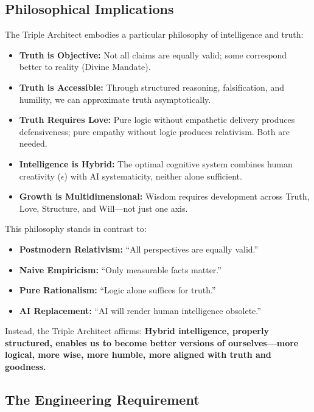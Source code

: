 \documentclass[11pt,a4paper]{article}
\theoremstyle{definition}
\theoremstyle{remark}
\begin{document}
\subsection{Philosophical Implications}

The Triple Architect embodies a particular philosophy of intelligence and truth:

\begin{itemize}
    \item \textbf{Truth is Objective:} Not all claims are equally valid; some correspond better to reality (Divine Mandate).
    
    \item \textbf{Truth is Accessible:} Through structured reasoning, falsification, and humility, we can approximate truth asymptotically.
    
    \item \textbf{Truth Requires Love:} Pure logic without empathetic delivery produces defensiveness; pure empathy without logic produces relativism. Both are needed.
    
    \item \textbf{Intelligence is Hybrid:} The optimal cognitive system combines human creativity ($\epsilon$) with AI systematicity, neither alone sufficient.
    
    \item \textbf{Growth is Multidimensional:} Wisdom requires development across Truth, Love, Structure, and Will—not just one axis.
\end{itemize}

This philosophy stands in contrast to:
\begin{itemize}
    \item \textbf{Postmodern Relativism:} ``All perspectives are equally valid.''
    \item \textbf{Naive Empiricism:} ``Only measurable facts matter.''
    \item \textbf{Pure Rationalism:} ``Logic alone suffices for truth.''
    \item \textbf{AI Replacement:} ``AI will render human intelligence obsolete.''
\end{itemize}

Instead, the Triple Architect affirms: \textbf{Hybrid intelligence, properly structured, enables us to become better versions of ourselves—more logical, more wise, more humble, more aligned with truth and goodness.}

\subsection{The Engineering Requirement}
\end{document}
